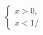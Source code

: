\documentclass[preview]{standalone}
\begin{document}
\begin{align*}
\begin{cases}x>0, \\ x <1/ \end{cases}
\end{align*}
\end{document}
